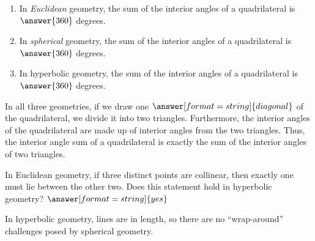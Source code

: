 \documentclass{ximera}
\begin{document}
\begin{problem}
\begin{enumerate}
\item In \emph{Euclidean} geometry, the sum of the interior angles of a quadrilateral is 
$\answer{360}$ degrees.
\item In \emph{spherical} geometry, the sum of the interior angles of a quadrilateral is 
$\answer{360}$ degrees.
\item In hyperbolic geometry, the sum of the interior angles of a quadrilateral is 
$\answer{360}$ degrees.
\end{enumerate}
\begin{problem}
In all three geometries, if we draw one $\answer[format=string]{diagonal}$ of the quadrilateral, we divide it into two triangles.  Furthermore, the interior angles of the quadrilateral are made up of interior angles from the two triangles.  Thus, the interior angle sum of a quadrilateral is exactly the sum of the interior angles of two triangles.  
\end{problem}
\end{problem}

\begin{problem} %
In Euclidean geometry, if three distinct points are collinear, then exactly one must lie between the other two.  Does this statement hold in hyperbolic geometry? 
$\answer[format=string]{yes}$
\begin{feedback}[correct]
In hyperbolic geometry, lines are  in length, so there are no ``wrap-around'' challenges posed by spherical geometry.  
\end{feedback}
\end{problem}


\end{document}
